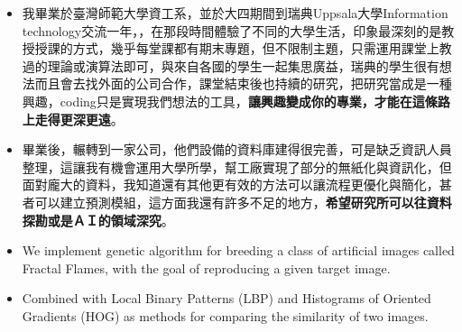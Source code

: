 \documentclass[10pt,a4paper]{altacv}
\begin{document}
\tagline{}

\begin{fullwidth}
\makecvheader
\end{fullwidth}



\begin{itemize}
\item 我畢業於臺灣師範大學資工系，並於大四期間到瑞典Uppsala大學Information technology交流一年，，在那段時間體驗了不同的大學生活，印象最深刻的是教授授課的方式，幾乎每堂課都有期末專題，但不限制主題，只需運用課堂上教過的理論或演算法即可，與來自各國的學生一起集思廣益，瑞典的學生很有想法而且會去找外面的公司合作，課堂結束後也持續的研究，把研究當成是一種興趣，coding只是實現我們想法的工具，\textbf{讓興趣變成你的專業，才能在這條路上走得更深更遠}。
\item 畢業後，輾轉到一家公司，他們設備的資料庫建得很完善，可是缺乏資訊人員整理，這讓我有機會運用大學所學，幫工廠實現了部分的無紙化與資訊化，但面對龐大的資料，我知道還有其他更有效的方法可以讓流程更優化與簡化，甚者可以建立預測模組，這方面我還有許多不足的地方，\textbf{希望研究所可以往資料探勘或是ＡＩ的領域深究}。
\end{itemize}

\begin{itemize}
\item We implement genetic algorithm for breeding a class of artificial images called Fractal Flames, with the goal of reproducing a given target image.
\item Combined with Local Binary Patterns (LBP) and Histograms of Oriented Gradients (HOG) as methods for comparing the similarity of two images.
\end{itemize}
\divider
\end{document}
